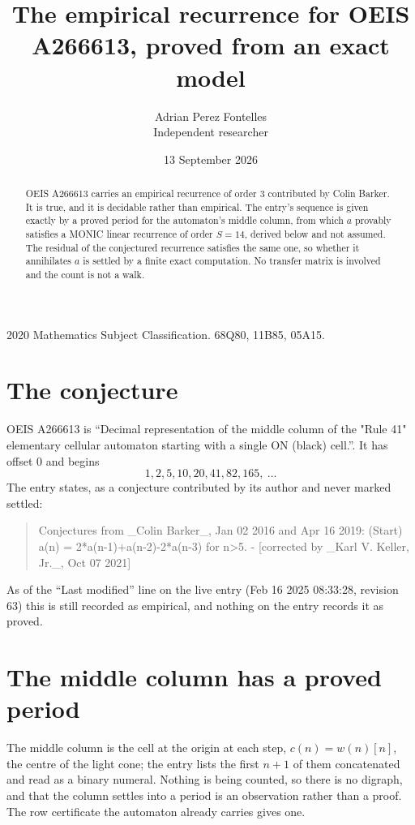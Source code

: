 \documentclass[11pt,a4paper]{article}
\title{The empirical recurrence for OEIS A266613, proved from an exact model}
\author{Adrian Perez Fontelles\\ \small Independent researcher}
\date{13 September 2026}
\theoremstyle{plain}
\theoremstyle{definition}
\begin{document}
\maketitle

\begin{abstract}
OEIS A266613 carries an empirical recurrence of order $3$ contributed by Colin Barker. It is true, and it is
decidable rather than empirical. The entry's sequence is given exactly by a proved period for the automaton's middle column, from
which $a$ provably satisfies a MONIC linear recurrence of order $S=14$, derived below and not
assumed. The residual of the conjectured recurrence satisfies the same one, so whether it
annihilates $a$ is settled by a finite exact computation. No transfer matrix is involved and
the count is not a walk.
\end{abstract}

\noindent\small 2020 Mathematics Subject Classification. 68Q80, 11B85, 05A15.\normalsize

\section{The conjecture}

OEIS A266613 is ``Decimal representation of the middle column of the "Rule 41" elementary cellular automaton starting with a single ON (black) cell.''. It has offset $0$ and begins
\[
1, 2, 5, 10, 20, 41, 82, 165,\ \dots
\]
The entry states, as a conjecture contributed by its author and never marked settled:
\begin{quote}
Conjectures from \_Colin Barker\_, Jan 02 2016 and Apr 16 2019: (Start) a(n) = 2*a(n-1)+a(n-2)-2*a(n-3) for n>5. - [corrected by \_Karl V. Keller, Jr.\_, Oct 07 2021]
\end{quote}
As of the ``Last modified'' line on the live entry (Feb 16 2025 08:33:28, revision 63)
this is still recorded as empirical, and nothing on the entry records it as proved.

\section{The middle column has a proved period}

The middle column is the cell at the origin at each step, $c(n)=w(n)[n]$, the centre of the
light cone; the entry lists the first $n+1$ of them concatenated and read as a binary numeral. Nothing is being counted, so there is no digraph, and that
the column settles into a period is an observation rather than a proof. The row certificate the
automaton already carries gives one.
\end{document}
